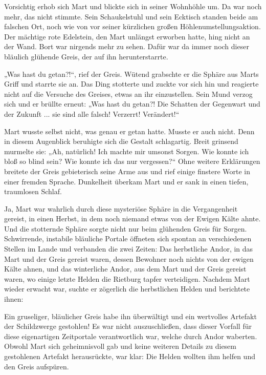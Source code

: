 Vorsichtig erhob sich Mart und blickte sich in seiner Wohnhöhle um. Da war noch mehr, das nicht stimmte. Sein Schaukelstuhl und sein Ecktisch standen beide am falschen Ort, noch wie von vor seiner kürzlichen großen Höhlenumstellungsaktion. Der mächtige rote Edelstein, den Mart unlängst erworben hatte, hing nicht an der Wand. Bort war nirgends mehr zu sehen. Dafür war da immer noch dieser bläulich glühende Greis, der auf ihn herunterstarrte.

„Was hast du getan?!“, rief der Greis. Wütend grabschte er die Sphäre aus Marts Griff und starrte sie an. Das Ding stotterte und zuckte vor sich hin und reagierte nicht auf die Versuche des Greises, etwas an ihr einzustellen. Sein Mund verzog sich und er brüllte erneut: „Was hast du getan?! Die Schatten der Gegenwart und der Zukunft ... sie sind alle falsch! Verzerrt! Verändert!“

Mart wusste selbst nicht, was genau er getan hatte. Musste er auch nicht. Denn in diesem Augenblick beruhigte sich die Gestalt schlagartig. Breit grinsend murmelte sie: „Ah, natürlich! Ich machte mir umsonst Sorgen. Wie konnte ich bloß so blind sein? Wie konnte ich das nur vergessen?“ Ohne weitere Erklärungen breitete der Greis gebieterisch seine Arme aus und rief einige finstere Worte in einer fremden Sprache. Dunkelheit überkam Mart und er sank in einen tiefen, traumlosen Schlaf. 



\trennzeichen



Ja, Mart war wahrlich durch diese mysteriöse Sphäre in die Vergangenheit gereist, in einen Herbst, in dem noch niemand etwas von der Ewigen Kälte ahnte. Und die stotternde Sphäre sorgte nicht nur beim glühenden Greis für Sorgen. Schwirrende, instabile bläuliche Portale öffneten sich spontan an verschiedenen Stellen im Lande und verbanden die zwei Zeiten: Das herbstliche Andor, in das Mart und der Greis gereist waren, dessen Bewohner noch nichts von der ewigen Kälte ahnen, und das winterliche Andor, aus dem Mart und der Greis gereist waren, wo einige letzte Helden die Rietburg tapfer verteidigen. Nachdem Mart wieder erwacht war, suchte er zögerlich die herbstlichen Helden und berichtete ihnen: 

Ein gruseliger, bläulicher Greis habe ihn überwältigt und ein wertvolles Artefakt der Schildzwerge gestohlen! Es war nicht auszuschließen, dass dieser Vorfall für diese eigenartigen Zeitportale verantwortlich war, welche durch Andor waberten. Obwohl Mart sich geheimnisvoll gab und keine weiteren Details zu diesem gestohlenen Artefakt herausrückte, war klar: Die Helden wollten ihm helfen und den Greis aufspüren. 

